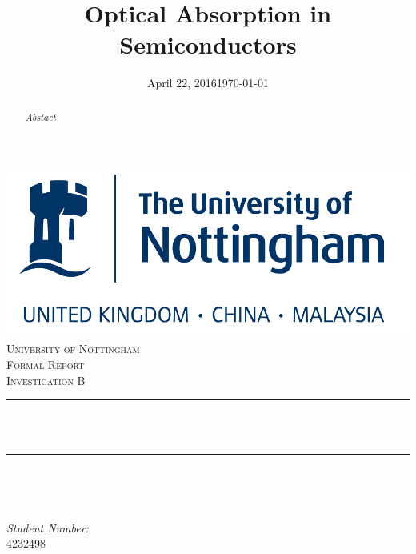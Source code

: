 \documentclass{physics_article_B}
\title{Optical Absorption in Semiconductors}
\author{}
\date{April 22, 2016}
\date{\today{}}
\makeatletter
\let\thetitle\@title
\let\theauthor\@author
\let\thedate\@date
\makeatother
\begin{document}
\begin{titlepage}
	\centering
    \vspace*{0.5 cm}
    \includegraphics[scale = 0.4]{uon.png}\\[1.0 cm]	%
    \textsc{\LARGE University of Nottingham}\\[2.0 cm]	%
	\textsc{\Large Formal Report}\\[0.5 cm]				%
	\textsc{\large Investigation B}\\[0.5 cm]				%
	\rule{\linewidth}{0.2 mm} \\[0.4 cm]
	{ \huge \bfseries \thetitle}\\
	\rule{\linewidth}{0.2 mm} \\[1.5 cm]
	
	\begin{minipage}{0.4\textwidth}
		\begin{flushleft} \large
			
			\theauthor
			\end{flushleft}
			\end{minipage}~
			\begin{minipage}{0.4\textwidth}
			\begin{flushright} \large
			\emph{Student Number:} \\
			4232498									%
		\end{flushright}
	\end{minipage}\\[2 cm]
	
	{\large \thedate}\\[2 cm]
 
	\vfill
	
\end{titlepage}

\tableofcontents
\pagebreak

\begin{abstract}

\emph{Abstact}

\end{abstract}
\end{document}
